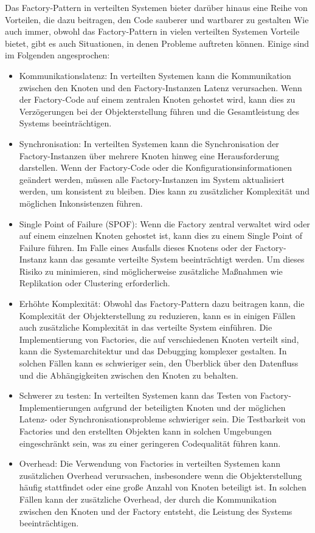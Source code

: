 \documentclass[../vs-script-first-v01.tex]{subfiles}
\begin{document}
Das Factory-Pattern in verteilten Systemen bieter darüber hinaus eine Reihe von Vorteilen, die dazu beitragen, den Code sauberer und wartbarer zu gestalten Wie auch immer, obwohl das Factory-Pattern in vielen verteilten Systemen Vorteile bietet, gibt es auch Situationen, in denen Probleme auftreten können. Einige sind im Folgenden angesprochen:
\begin{itemize}
\item Kommunikationslatenz: In verteilten Systemen kann die Kommunikation zwischen den Knoten und den Factory-Instanzen Latenz verursachen. Wenn der Factory-Code auf einem zentralen Knoten gehostet wird, kann dies zu Verzögerungen bei der Objekterstellung führen und die Gesamtleistung des Systems beeinträchtigen.
\item Synchronisation: In verteilten Systemen kann die Synchronisation der Factory-Instanzen über mehrere Knoten hinweg eine Herausforderung darstellen. Wenn der Factory-Code oder die Konfigurationsinformationen geändert werden, müssen alle Factory-Instanzen im System aktualisiert werden, um konsistent zu bleiben. Dies kann zu zusätzlicher Komplexität und möglichen Inkonsistenzen führen.
\item Single Point of Failure (SPOF): Wenn die Factory zentral verwaltet wird oder auf einem einzelnen Knoten gehostet ist, kann dies zu einem Single Point of Failure führen. Im Falle eines Ausfalls dieses Knotens oder der Factory-Instanz kann das gesamte verteilte System beeinträchtigt werden. Um dieses Risiko zu minimieren, sind möglicherweise zusätzliche Maßnahmen wie Replikation oder Clustering erforderlich.
\item Erhöhte Komplexität: Obwohl das Factory-Pattern dazu beitragen kann, die Komplexität der Objekterstellung zu reduzieren, kann es in einigen Fällen auch zusätzliche Komplexität in das verteilte System einführen. Die Implementierung von Factories, die auf verschiedenen Knoten verteilt sind, kann die Systemarchitektur und das Debugging komplexer gestalten. In solchen Fällen kann es schwieriger sein, den Überblick über den Datenfluss und die Abhängigkeiten zwischen den Knoten zu behalten.
\item Schwerer zu testen: In verteilten Systemen kann das Testen von Factory-Implementierungen aufgrund der beteiligten Knoten und der möglichen Latenz- oder Synchronisationsprobleme schwieriger sein. Die Testbarkeit von Factories und den erstellten Objekten kann in solchen Umgebungen eingeschränkt sein, was zu einer geringeren Codequalität führen kann.
\item Overhead: Die Verwendung von Factories in verteilten Systemen kann zusätzlichen Overhead verursachen, insbesondere wenn die Objekterstellung häufig stattfindet oder eine große Anzahl von Knoten beteiligt ist. In solchen Fällen kann der zusätzliche Overhead, der durch die Kommunikation zwischen den Knoten und der Factory entsteht, die Leistung des Systems beeinträchtigen.
\end{itemize}
\end{document}
